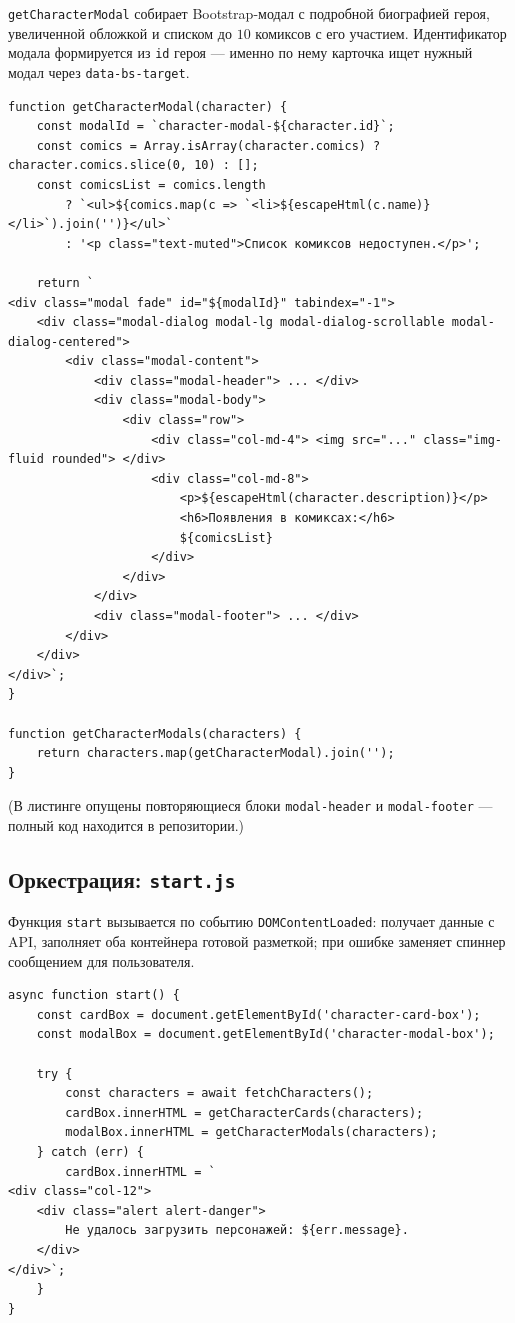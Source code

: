 \texttt{getCharacterModal} собирает Bootstrap-модал с подробной
биографией героя, увеличенной обложкой и списком до \(10\) комиксов с
его участием. Идентификатор модала формируется из \texttt{id} героя ---
именно по нему карточка ищет нужный модал через
\texttt{data-bs-target}.

\begin{lstlisting}[caption={\texttt{getCharacterModal} --- модальное окно},captionpos=b]
function getCharacterModal(character) {
    const modalId = `character-modal-${character.id}`;
    const comics = Array.isArray(character.comics) ? character.comics.slice(0, 10) : [];
    const comicsList = comics.length
        ? `<ul>${comics.map(c => `<li>${escapeHtml(c.name)}</li>`).join('')}</ul>`
        : '<p class="text-muted">Список комиксов недоступен.</p>';

    return `
<div class="modal fade" id="${modalId}" tabindex="-1">
    <div class="modal-dialog modal-lg modal-dialog-scrollable modal-dialog-centered">
        <div class="modal-content">
            <div class="modal-header"> ... </div>
            <div class="modal-body">
                <div class="row">
                    <div class="col-md-4"> <img src="..." class="img-fluid rounded"> </div>
                    <div class="col-md-8">
                        <p>${escapeHtml(character.description)}</p>
                        <h6>Появления в комиксах:</h6>
                        ${comicsList}
                    </div>
                </div>
            </div>
            <div class="modal-footer"> ... </div>
        </div>
    </div>
</div>`;
}

function getCharacterModals(characters) {
    return characters.map(getCharacterModal).join('');
}
\end{lstlisting}

(В листинге опущены повторяющиеся блоки \texttt{modal-header} и
\texttt{modal-footer} --- полный код находится в репозитории.)

\subsection{Оркестрация: \texttt{start.js}}

Функция \texttt{start} вызывается по событию
\texttt{DOMContentLoaded}: получает данные с API, заполняет оба
контейнера готовой разметкой; при ошибке заменяет спиннер сообщением
для пользователя.

\begin{lstlisting}[caption={\texttt{les-3/start.js} --- запуск приложения},captionpos=b]
async function start() {
    const cardBox = document.getElementById('character-card-box');
    const modalBox = document.getElementById('character-modal-box');

    try {
        const characters = await fetchCharacters();
        cardBox.innerHTML = getCharacterCards(characters);
        modalBox.innerHTML = getCharacterModals(characters);
    } catch (err) {
        cardBox.innerHTML = `
<div class="col-12">
    <div class="alert alert-danger">
        Не удалось загрузить персонажей: ${err.message}.
    </div>
</div>`;
    }
}
\end{lstlisting}

